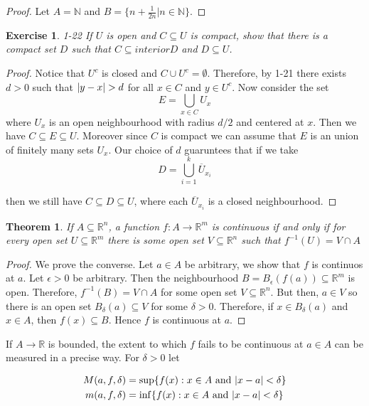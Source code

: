 \documentclass[12pt]{book}
\newtheorem{theorem}{Theorem}
\newtheorem*{exercise*}{Exercise}
\newcommand{\interior}{interior}
\newcommand{\tand}{\ \text{and} \ }
\begin{document}
\begin{proof}
  Let $A = \mathbb{N}$ and $B = \{n + \frac{1}{2n} | n \in \mathbb{N} \}$. 
\end{proof}

\begin{exercise*}
  1-22 If $U$ is open and $C \subseteq U$ is compact, show that there is a
  compact set $D$ such that $C \subseteq \interior D$ and $D \subseteq U$. 
\end{exercise*}

\begin{proof}
  Notice that $U^c$ is closed and $C \cup U^c = \emptyset$. Therefore, by 1-21 there exists $d> 0$ such that $\abs{y -x } > d$ for all $x \in C$ and $y \in U^c$. Now consider the set
  \[
  E = \bigcup_{x \in C} U_x
  \]
  where $U_x$ is an open neighbourhood with radius $d/2$ and centered at $x$. Then we have $C \subseteq E \subseteq U$. Moreover since $C$ is compact we can assume that $E$ is an union of finitely many sets $U_x$. Our choice of $d$ guaruntees that if we take
  \[
  D = \bigcup_{i=1}^k\overline{U}_{x_i}
  \] 

then we still have $C \subseteq D \subseteq U$, where each $\overline{U}_{x_i}$
is a closed neighbourhood.
\end{proof}

\begin{theorem}
  If $A \subseteq \mathbb{R}^n$, a function $f : A \to \mathbb{R}^m$ is continuous if and only if for every open set $U \subseteq \mathbb{R}^m$ there is some open set $V\subseteq \mathbb{R}^n$ such that $f^{-1}(U) = V \cap A$
\end{theorem}

\begin{proof}
  We prove the converse. Let $a \in A$ be arbitrary, we show that $f$ is continuos at $a$. Let $\epsilon > 0$ be arbitrary. Then the neighbourhood $B = B_{\epsilon}(f(a)) \subseteq \mathbb{R}^m$ is open. Therefore, $f^{-1}(B) = V \cap A$  for some open set $V \subseteq \mathbb{R}^n$. But then, $a \in V$ so there is an open set $B_{\delta}(a) \subseteq V$  for some $\delta > 0$. Therefore, if $x \in B_{\delta}(a)$ and $x \in A$, then $f(x) \subseteq B$. Hence $f$ is continuous at $a$.  
\end{proof}

If $A \to \mathbb{R}$ is bounded, the extent to which $f$ fails to be continuous at $a \in A$ can be measured in a precise way. For $\delta > 0$ let

\begin{align*}
  M(a,f,\delta) &= \sup \{ f(x) : x \in A \tand  \abs{x-a} < \delta \}\\
  m(a,f,\delta) &= \inf \{ f(x) : x \in A \tand  \abs{x-a} < \delta \}\\  
\end{align*}
\end{document}
